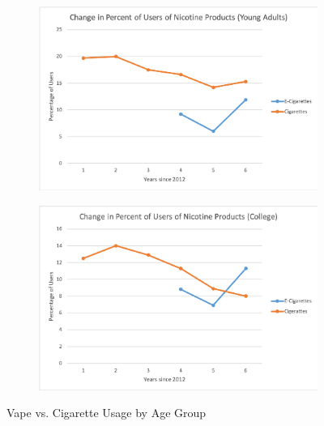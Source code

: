 \documentclass[12pt,letterpaper]{article}
\begin{document}
\begin{figure}[H]
  \begin{subfigure}[t]{.4\linewidth}
  \includegraphics[width=\linewidth]{percentUsersYA}
  \end{subfigure}
  \begin{subfigure}[t]{.4\linewidth}
  \includegraphics[width=\linewidth]{percentUsersCo}
  \end{subfigure}
  \caption{Vape vs. Cigarette Usage by Age Group \citep{noauthor_college-age_2018}}
\end{figure}
\end{document}

